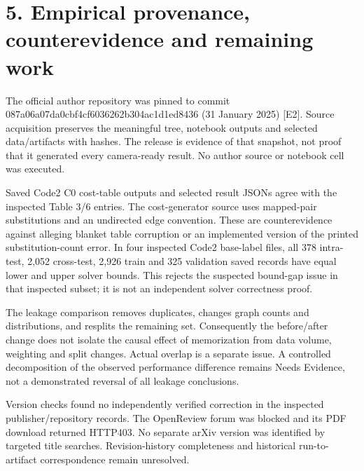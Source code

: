 \documentclass[10pt]{article}
\begin{document}
\section*{5. Empirical provenance, counterevidence and remaining work}
The official author repository was pinned to commit 087a06a07da0cbf4cf6036262b304ac1d1ed8436 (31 January 2025) [E2]. Source acquisition preserves the meaningful tree, notebook outputs and selected data/artifacts with hashes. The release is evidence of that snapshot, not proof that it generated every camera-ready result. No author source or notebook cell was executed.\par
Saved Code2 C0 cost-table outputs and selected result JSONs agree with the inspected Table 3/6 entries. The cost-generator source uses mapped-pair substitutions and an undirected edge convention. These are counterevidence against alleging blanket table corruption or an implemented version of the printed substitution-count error. In four inspected Code2 base-label files, all 378 intra-test, 2,052 cross-test, 2,926 train and 325 validation saved records have equal lower and upper solver bounds. This rejects the suspected bound-gap issue in that inspected subset; it is not an independent solver correctness proof.\par
The leakage comparison removes duplicates, changes graph counts and distributions, and resplits the remaining set. Consequently the before/after change does not isolate the causal effect of memorization from data volume, weighting and split changes. Actual overlap is a separate issue. A controlled decomposition of the observed performance difference remains Needs Evidence, not a demonstrated reversal of all leakage conclusions.\par
Version checks found no independently verified correction in the inspected publisher/repository records. The OpenReview forum was blocked and its PDF download returned HTTP403. No separate arXiv version was identified by targeted title searches. Revision-history completeness and historical run-to-artifact correspondence remain unresolved.\par
\end{document}

